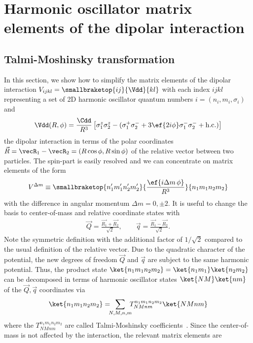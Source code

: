 \chapter{Harmonic oscillator matrix elements of the dipolar interaction}
\label{matrix_elements}

\section{Talmi-Moshinsky transformation}
In this section, we show how to simplify the matrix elements of the dipolar interaction $V_{ijkl}=\smallbraketop{ij}{\Vdd}{kl}$ with each index $ijkl$ representing a set of 2D harmonic oscillator quantum numbers $i=(n_i,m_i,\sigma_i)$ and
\begin{align}
\Vdd(R,\phi) =  \frac{\Cdd}{R^3} \left[
\sigma^z_1 \sigma^z_2 - (\sigma^+_1 \sigma^-_2 +3 \ef{2i\phi} \sigma^-_1 \sigma^-_2  +\text{h.c.})
\right]
\end{align}
the dipolar interaction in terms of the polar coordinates $\vec{R}=\vecR_1-\vecR_2=(R\cos \phi, R\sin \phi)$ of the relative vector between two particles. The spin-part is easily resolved and we can concentrate on matrix elements of the form
\begin{align}
V^{\Delta m}\equiv\smallbraketop{n_1'm_1'n_2'm_2'}{\frac{\ef{i\Delta m\, \phi}}{R^3}}{n_1m_1n_2m_2}
\end{align}
with the difference in angular momentum $\Delta m = 0, \pm 2$.
It is useful to change the basis to center-of-mass and relative coordinate states with
\begin{align}
    \vec{Q} = \frac{\vec{R_1} + \vec{R_2}}{\sqrt{2}}, \qquad \vec{q} = \frac{\vec{R_1} - \vec{R_2}}{\sqrt{2}}.
\end{align}
Note the symmetric definition with the additional factor of $1/\sqrt{2}$ compared to the usual definition of the relative vector.
Due to the quadratic character of the potential, the new degrees of freedom $\vec{Q}$ and $\vec{q}$ are subject to the same harmonic potential. Thus, the product state $\ket{n_1m_1n_2m_2}=\ket{n_1m_1}\ket{n_2m_2}$ can be decomposed in terms of harmonic oscillator states $\ket{NM}\ket{nm}$ of the $\vec{Q},\vec{q}$ coordinates via
\begin{align}
\ket{n_1m_1n_2m_2} = \!\!\! \sum_{N,M,n,m} \!\!\! T^{n_1m_1n_2m_2}_{NMnm} \ket{NMnm}
\end{align}
where the $T^{n_1m_1n_2m_2}_{NMnm}$ are called Talmi-Moshinsky coefficients~\cite{Moshinsky1959,Talmi1952}. Since the center-of-mass is not affected by the interaction, the relevant matrix elements are
